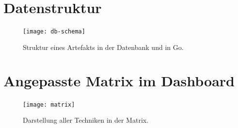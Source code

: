 \chapter{Datenstruktur}
\label{app:db-schema}

\begin{figure}[!htb]
    \centering
    \texttt{[image: db-schema]}
    \caption{Struktur eines Artefakts in der Datenbank und in Go.}
\end{figure}

\chapter{Angepasste Matrix im Dashboard}
\label{app:matrix}
\begin{figure}[!htb]
    \centering
    \texttt{[image: matrix]}
    \caption{Darstellung aller Techniken in der Matrix.}
\end{figure}

